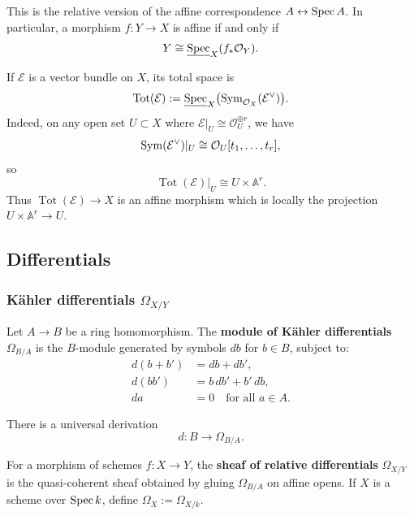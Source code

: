 \documentclass[12pt]{article}
\begin{document}
\begin{remark}
    This is the relative version of the affine correspondence \(A \leftrightarrow \operatorname{Spec} A\). In particular, a morphism \(f:Y\to X\) is affine if and only if
    \[
        Y\cong \underline{\operatorname{Spec}}_X(f_*\mathcal O_Y).
    \]
\end{remark}

\begin{example}
    If \(\mathcal E\) is a vector bundle on \(X\), its total space is
    \[
        \operatorname{Tot}(\mathcal E):=\underline{\operatorname{Spec}}_X\bigl(\operatorname{Sym}_{\mathcal O_X}(\mathcal E^\vee)\bigr).
    \]
    Indeed, on any open set \(U\subset X\) where \(\mathcal E|_U\cong \mathcal O_U^{\oplus r}\), we have
    \[
        \operatorname{Sym}(\mathcal E^\vee)|_U \cong \mathcal O_U[t_1,\dots,t_r],
    \]
    so
    \[
        \operatorname{Tot}(\mathcal E)|_U \cong U\times \mathbb A^r.
    \]
    Thus \(\operatorname{Tot}(\mathcal E)\to X\) is an affine morphism which is locally the projection \(U\times \mathbb A^r\to U\).
\end{example}\subsection{Differentials}

\subsubsection{Kähler differentials $\Omega_{X/Y}$}

\begin{definition}
    Let $A \to B$ be a ring homomorphism. The \textbf{module of Kähler differentials} $\Omega_{B/A}$ is the $B$-module generated by symbols $db$ for $b \in B$, subject to:
    \begin{align*}
        d(b+b') & = db + db',                        \\
        d(bb')  & = b\,db' + b'\,db,                 \\
        da      & = 0 \quad \text{for all } a \in A.
    \end{align*}
\end{definition}

There is a universal derivation
\[
    d : B \to \Omega_{B/A}.
\]

\begin{definition}
    For a morphism of schemes $f:X \to Y$, the \textbf{sheaf of relative differentials} $\Omega_{X/Y}$ is the quasi-coherent sheaf obtained by gluing $\Omega_{B/A}$ on affine opens. If $X$ is a scheme over $\operatorname{Spec} k$, define $\Omega_X := \Omega_{X/k}$.
\end{definition}
\end{document}
